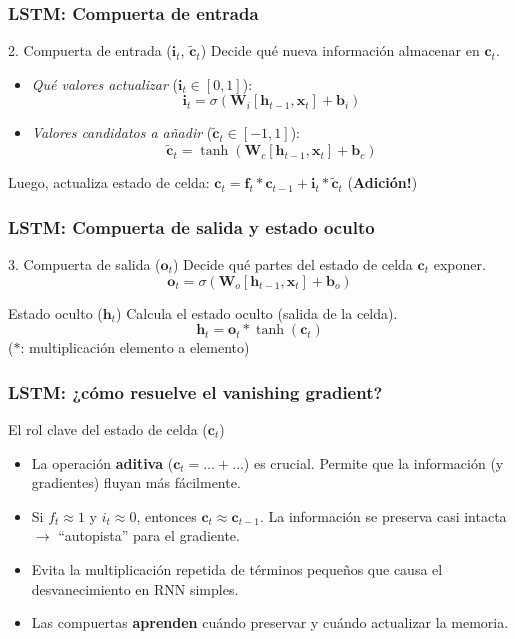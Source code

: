 \documentclass[handout]{beamer}
\newcommand{\vect}[1]{\mathbf{#1}} %
\newcommand{\mat}[1]{\mathbf{#1}}  %
\begin{document}
\begin{frame}
    \frametitle{LSTM: Compuerta de entrada}
    \begin{block}{2. Compuerta de entrada ($\vect{i}_t$, $\tilde{\vect{c}}_t$)}
        Decide qué nueva información almacenar en $\vect{c}_t$.
        \begin{itemize}
            \item \textit{Qué valores actualizar} ($\vect{i}_t \in [0, 1]$):
            \[ \vect{i}_t = \sigma(\mat{W}_i [\vect{h}_{t-1}, \vect{x}_t] + \vect{b}_i) \]
            \item \textit{Valores candidatos a añadir} ($\tilde{\vect{c}}_t \in [-1, 1]$):
            \[ \tilde{\vect{c}}_t = \tanh(\mat{W}_c [\vect{h}_{t-1}, \vect{x}_t] + \vect{b}_c) \]
        \end{itemize}
        Luego, actualiza estado de celda: $\vect{c}_t = \vect{f}_t * \vect{c}_{t-1} + \vect{i}_t * \tilde{\vect{c}}_t$ (\textbf{Adición!})
    \end{block}
\end{frame}

\begin{frame}
    \frametitle{LSTM: Compuerta de salida y estado oculto}
    \begin{block}{3. Compuerta de salida ($\vect{o}_t$)}
         Decide qué partes del estado de celda $\vect{c}_t$ exponer.
         \[ \vect{o}_t = \sigma(\mat{W}_o [\vect{h}_{t-1}, \vect{x}_t] + \vect{b}_o) \]
    \end{block}
    \begin{block}{Estado oculto ($\vect{h}_t$)}
         Calcula el estado oculto (salida de la celda).
         \[ \vect{h}_t = \vect{o}_t * \tanh(\vect{c}_t) \]
         ($*$: multiplicación elemento a elemento)
    \end{block}
\end{frame}

\begin{frame}
    \frametitle{LSTM: ¿cómo resuelve el vanishing gradient?}
    \begin{block}{El rol clave del estado de celda ($\vect{c}_t$)}
        \begin{itemize}
            \item La operación \textbf{aditiva} ($\vect{c}_t = \dots + \dots$) es crucial. Permite que la información (y gradientes) fluyan más fácilmente.
            \item Si $f_t \approx 1$ y $i_t \approx 0$, entonces $\vect{c}_t \approx \vect{c}_{t-1}$. La información se preserva casi intacta $\rightarrow$ ``autopista'' para el gradiente.
            \item Evita la multiplicación repetida de términos pequeños que causa el desvanecimiento en RNN simples.
            \item Las compuertas \textbf{aprenden} cuándo preservar y cuándo actualizar la memoria.
        \end{itemize}
    \end{block}
\end{frame}
\end{document}
